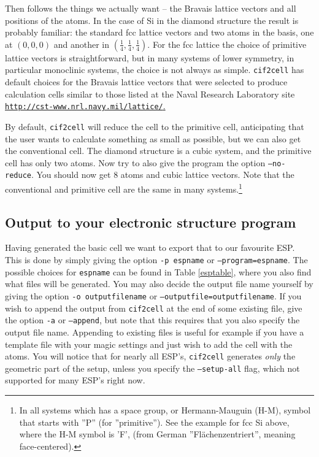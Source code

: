 \documentclass[11pt]{article}
\newcommand{\ciftocell}{\texttt{cif2cell}}
\begin{document}
Then follows the things we actually want -- the Bravais lattice vectors and all positions of the atoms.  In the case of Si in the diamond structure the result is probably familiar:  the standard fcc lattice vectors and two atoms in the basis, one at $(0,0,0)$ and another in $(\frac{1}{4},\frac{1}{4},\frac{1}{4})$. For the fcc lattice the choice of primitive lattice vectors is straightforward, but in many systems of lower symmetry, in particular monoclinic systems, the choice is not always as simple. \ciftocell{} has default choices for the Bravais lattice vectors that were selected to produce calculation cells similar to those listed at the Naval Research Laboratory site \href{http://cst-www.nrl.navy.mil/lattice/}{\texttt{http://cst-www.nrl.navy.mil/lattice/}.}

By default, \ciftocell{} will reduce the cell to the primitive cell, anticipating that the user wants to calculate something as small as possible, but we can also get the conventional cell. The diamond structure is a cubic system, and the primitive cell has only two atoms. Now try to also give the program the option \texttt{--no-reduce}. You should now get 8 atoms and cubic lattice vectors. Note that the conventional and primitive cell are the same in many systems.\footnote{In all systems which has a space group, or Hermann-Mauguin (H-M), symbol that starts with ''P'' (for ''primitive''). See the example for fcc Si above, where the H-M symbol is 'F', (from German ''Fl\"achenzentriert'', meaning face-centered).}

\subsection{Output to your electronic structure program}

Having generated the basic cell we want to export that to our favourite ESP. This is done by simply giving the option \texttt{-p espname} or \texttt{--program=espname}. The possible choices for \texttt{espname} can be found in Table \ref{esptable}, where you also find what files will be generated. You may also decide the output file name yourself by giving the option \texttt{-o outputfilename} or \texttt{---outputfile=outputfilename}. If you wish to append the output from \ciftocell{} at the end of some existing file, give the option \texttt{-a} or \texttt{--append}, but note that this requires that you also specify the output file name. Appending to existing files is useful for example if you have a template file with your magic settings and just wish to add the cell with the atoms. You will notice that for nearly all ESP's, \ciftocell{} generates \emph{only} the geometric part of the setup, unless you specify the \texttt{--setup-all} flag, which not supported for many ESP's right now. 
\end{document}
